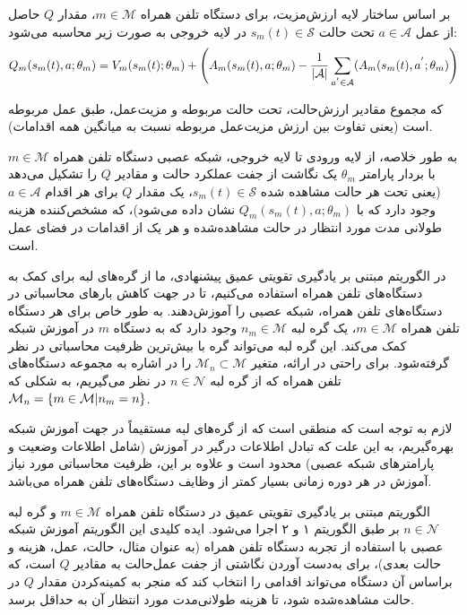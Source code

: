 بر اساس ساختار لایه ارزش‌مزیت، برای دستگاه تلفن همراه $m \in \mathcal{M}$، مقدار $Q$ حاصل از عمل $a \in \mathcal{A}$ تحت حالت $s_m(t) \in \mathcal{S}$ در لایه خروجی به صورت زیر محاسبه می‌شود:
\begin{alignat}{2}
	Q_m(s_m(t),a;\theta_m) = V_m(s_m(t);\theta_m) + \Bigg( A_m(s_m(t),a;\theta_m) - {1 \over |\mathcal{A}|} \sum\limits_{a^{'} \in \mathcal{A}}(A_m(s_m(t),a^{'};\theta_m) \Bigg)
	\label{60}  
\end{alignat}

که مجموع مقادیر ارزش‌حالت، تحت حالت مربوطه و مزیت‌عمل، طبق عمل مربوطه است (یعنی تفاوت بین ارزش مزیت‌عمل مربوطه نسبت به میانگین همه اقدامات).

به طور خلاصه، از لایه ورودی تا لایه خروجی، شبکه عصبی دستگاه تلفن همراه $m \in \mathcal{M}$ با بردار پارامتر $\theta_m$ یک نگاشت از جفت عملکرد حالت و مقادیر $Q$ را تشکیل می‌دهد (یعنی تحت هر حالت مشاهده شده $s_m(t) \in \mathcal{S}$، یک مقدار $Q$ برای هر اقدام $a \in \mathcal{A}$ وجود دارد که با $Q_m(s_m(t),a;\theta_m)$ نشان داده می‌شود)، که مشخص‌کننده هزینه طولانی مدت مورد انتظار در حالت مشاهده‌شده و هر یک از اقدامات در فضای عمل است.






در الگوریتم مبتنی بر یادگیری تقویتی عمیق پیشنهادی، ما از گره‌های لبه برای کمک به دستگاه‌های تلفن همراه استفاده می‌کنیم، تا در جهت کاهش بارهای محاسباتی در دستگاه‌های تلفن همراه،  شبکه عصبی را آموزش‌دهند. به طور خاص برای هر دستگاه تلفن همراه $m \in \mathcal{M}$، یک گره لبه $n_m \in \mathcal{M}$ وجود دارد که به دستگاه $m$ در آموزش شبکه کمک می‌کند. این گره لبه می‌تواند گره‌ با بیش‌ترین ظرفیت محاسباتی در نظر گرفته‌شود. برای راحتی در ارائه، متغیر  $\mathcal{M}_n \subset \mathcal{M}$ را در اشاره به مجموعه دستگاه‌های تلفن همراه که از گره لبه $n \in \mathcal{N}$ در نظر می‌گیریم، به شکلی که $\mathcal{M}_n = \left\{ m \in \mathcal{M}|n_m = n \right\}$.

لازم به توجه است که منطقی است که از گره‌های لبه مستقیماً در جهت آموزش شبکه بهره‌گیریم، به این علت که تبادل اطلاعات درگیر در آموزش (شامل اطلاعات وضعیت و پارامترهای شبکه عصبی) محدود است و علاوه بر این، ظرفیت محاسباتی مورد نیاز آموزش در هر دوره زمانی بسیار کمتر از وظایف دستگاه‌های تلفن همراه می‌باشد.

الگوریتم مبتنی بر یادگیری تقویتی عمیق در دستگاه تلفن همراه $m \in \mathcal{M}$ و گره لبه $n \in \mathcal{N}$ بر طبق الگوریتم ۱ و ۲ اجرا می‌شود. ایده کلیدی این الگوریتم آموزش شبکه عصبی با استفاده از تجربه دستگاه تلفن همراه (به عنوان مثال، حالت، عمل، هزینه و حالت بعدی)، برای به‌دست ‌آوردن نگاشتی از جفت عمل‌حالت به مقادیر $Q$ است، که براساس آن دستگاه می‌تواند اقدامی را انتخاب کند که منجر به کمینه‌کردن مقدار $Q$ در حالت مشاهده‌شده شود، تا هزینه طولانی‌مدت مورد انتظار آن به حداقل برسد.



